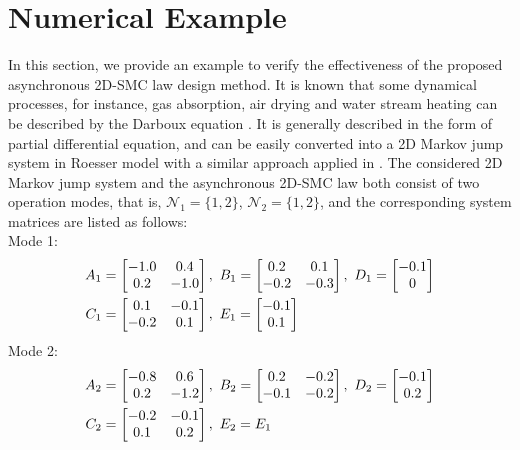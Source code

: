 \documentclass[conference]{IEEEtran}
\begin{document}
\section{Numerical Example} \label{example}
In this section, we provide an example to verify the effectiveness of the proposed asynchronous 2D-SMC law design method.  It is known that some dynamical processes, for instance, gas absorption, air drying and  water stream heating  can be described by the Darboux equation \cite{darboux-equation}. It is generally described in the form of partial differential equation, and can be easily converted into  a 2D Markov jump system in Roesser model with a similar approach applied in \cite{du-chunling&l-xie}. The considered 2D Markov jump system and the asynchronous  2D-SMC law both consist of two operation modes, that is, $\mathcal{N}_1=\{1,2\}$, $ \mathcal{N}_{2}=\{1,2\}$,  and the corresponding system matrices are listed  as follows: \\
Mode 1:
\begin{equation} \notag
\begin{aligned}
	A_{1} &= \begin{bmatrix}
	-1.0&0.4\\
	0.2&-1.0
	\end{bmatrix}, \ 
	B_{1} = \begin{bmatrix}
	0.2&0.1\\ -0.2&-0.3
	\end{bmatrix} ,\ 
	D_{1} = \begin{bmatrix}
		-0.1\\0
	\end{bmatrix} \\
	C_{1} &= \begin{bmatrix}
		0.1&-0.1\\-0.2&0.1
	\end{bmatrix},\ 
	E_{1} = \begin{bmatrix}
		-0.1\\ 0.1
	\end{bmatrix}
\end{aligned}  
\end{equation}
Mode 2:
\begin{equation} \notag
\begin{aligned}
A_{2} &=\begin{bmatrix}
-0.8&0.6\\
0.2&-1.2
\end{bmatrix}, \ 
B_{2} = \begin{bmatrix}
0.2&-0.2\\ -0.1&-0.2
\end{bmatrix} ,\ 
D_{2} = \begin{bmatrix}
-0.1\\0.2
\end{bmatrix} \\
C_{2} &= \begin{bmatrix}
-0.2&-0.1\\0.1&0.2
\end{bmatrix},\
E_{2} = E_{1}
\end{aligned}  
\end{equation}
\end{document}
